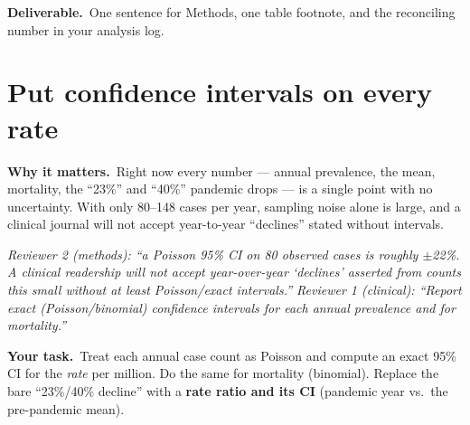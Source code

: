 \documentclass[11pt,a4paper]{article}
\newenvironment{reviewer}%
  {\def\FrameCommand{{\color{rulegray}\vrule width 1.5pt}\hspace{6pt}%
     \colorbox{quotebg}}%
   \MakeFramed{\advance\hsize-\width \FrameRestore}\small\itshape}%
  {\endMakeFramed}
\newcommand{\why}{\textbf{Why it matters.}\ }
\newcommand{\task}{\textbf{Your task.}\ }
\newcommand{\out}{\textbf{Deliverable.}\ }
\begin{document}
\out One sentence for Methods, one table footnote, and the reconciling number in your analysis
log.

\section{Put confidence intervals on every rate}

\why Right now every number --- annual prevalence, the mean, mortality, the ``23\%'' and
``40\%'' pandemic drops --- is a single point with no uncertainty. With only 80--148 cases per
year, sampling noise alone is large, and a clinical journal will not accept year-to-year
``declines'' stated without intervals.

\begin{reviewer}
Reviewer 2 (methods): ``a Poisson 95\% CI on 80 observed cases is roughly $\pm$22\%. A clinical
readership will not accept year-over-year `declines' asserted from counts this small without at
least Poisson/exact intervals.''
\end{reviewer}
\begin{reviewer}
Reviewer 1 (clinical): ``Report exact (Poisson/binomial) confidence intervals for each annual
prevalence and for mortality.''
\end{reviewer}

\task Treat each annual case count as Poisson and compute an exact 95\% CI for the \emph{rate}
per million. Do the same for mortality (binomial). Replace the bare ``23\%/40\% decline'' with a
\textbf{rate ratio and its CI} (pandemic year vs.\ the pre-pandemic mean).

\end{document}
